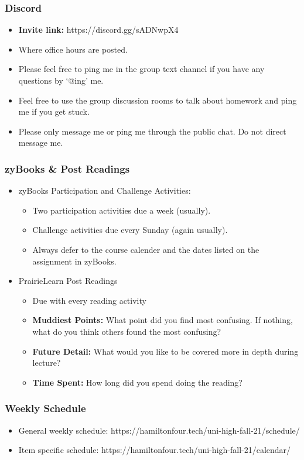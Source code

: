 \documentclass{beamer}
\begin{document}
\begin{frame}
  \frametitle{Discord}
  \begin{itemize}
    \item \textbf{Invite link:} https://discord.gg/sADNwpX4
    \item Where office hours are posted.
    \item Please feel free to ping me in the group text channel if you have any questions by `@ing' me.
    \item Feel free to use the group discussion rooms to talk about homework and ping me if you get stuck. 
    \item Please only message me or ping me through the public chat. Do not direct message me.
  \end{itemize}
\end{frame}

\begin{frame}
  \frametitle{zyBooks \& Post Readings}
  \begin{itemize}
    \item zyBooks Participation and Challenge Activities:
    \begin{itemize}
      \item Two participation activities due a week (usually).
      \item Challenge activities due every Sunday (again usually).
      \item Always defer to the course calender and the dates listed on the assignment in zyBooks.
    \end{itemize}
    \item PrairieLearn Post Readings
    \begin{itemize}
      \item Due with every reading activity
      \item \textbf{Muddiest Points: } What point did you find most confusing. If nothing, what do you think others found the most confusing?
      \item \textbf{Future Detail: } What would you like to be covered more in depth during lecture?
      \item \textbf{Time Spent: } How long did you spend doing the reading?
    \end{itemize}
  \end{itemize}
\end{frame}

\begin{frame}
  \frametitle{Weekly Schedule}
  \begin{itemize}
    \item General weekly schedule: https://hamiltonfour.tech/uni-high-fall-21/schedule/
    \item Item specific schedule: https://hamiltonfour.tech/uni-high-fall-21/calendar/
  \end{itemize}
\end{frame}
\end{document}
